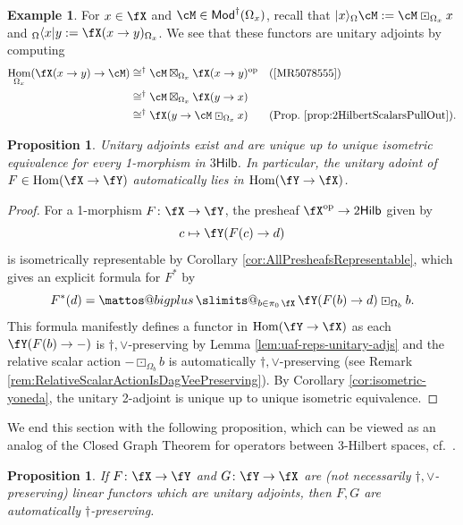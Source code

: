 \documentclass[12pt, reqno]{amsart}
\makeatletter
\DeclareMathOperator{\Hom}{Hom}
\DeclareMathOperator{\Irr}{\pi_0}
\newcommand{\op}{\mathrm{op}}
\newcommand{\Mod}{\mathsf{Mod}}
\newcommand{\Hilb}{\mathsf{Hilb}}
\theoremstyle{plain}
\newtheorem{prop}[thm]{Proposition}
\theoremstyle{definition}
\newtheorem{ex}[thm]{Example}
\newcommand{\bigboxplus}{%
  \DOTSB\mathop{\mathpalette\mattos@bigplus\relax}\slimits@
}
\newcommand\mattos@bigplus[2]{%
  \vcenter{\hbox{%
    \sbox\z@{$#1\sum$}%
    \resizebox{!}{0.9\dimexpr\ht\z@+\dp\z@}{\raisebox{\depth}{$\m@th#1\boxplus$}}%
  }}%
  \vphantom{\sum}%
}
\makeatother
\begin{document}
\begin{ex}
For $x\in\fX$ and $\cM\in \Mod^\dag(\Omega_x)$, recall that
$|x\rangle_\Omega \cM := \cM \boxdot_{\Omega_x} x$
and
${}_\Omega\langle x|y := \fX(x \to y)_{\Omega_x}$.
We see that these functors are unitary adjoints by computing
\begin{align*}    
\Hom_{\Omega_x}(\fX(x \to y) \to \cM)
&\cong^\dag 
\cM \boxtimes_{\Omega_x} \fX(x \to y)^{\op}
&&\text{(\cite[Prop.~3.14]{MR5078555})}
\\&\cong^\dag
\cM \boxtimes_{\Omega_x} \fX(y \to x) 
\\&\cong^\dag
\fX(y \to \cM \boxdot_{\Omega_x} x)
&&\text{(Prop.~\ref{prop:2HilbertScalarsPullOut}).}
\end{align*}
\end{ex}

\begin{prop}
Unitary adjoints exist 
and are unique up to unique isometric equivalence
for every 1-morphism in $3\Hilb$.
In particular, the unitary adoint of $F\in \Hom(\fX\to \fY)$ automatically lies in $\Hom(\fY\to \fX)$.
\end{prop}
\begin{proof}
For a 1-morphism $F\colon  \fX\to \fY$,
the presheaf $\fX^{\op}\to 2\Hilb$ given by
$$
c\mapsto \fY(F(c)\to d)
$$
is isometrically representable by Corollary \ref{cor:AllPresheafsRepresentable}, which gives an explicit formula for $F^*$ by 
\begin{equation}
\label{eq:Unitary2AdjointExists}    
F^*(d) = \bigboxplus_{b\in\Irr \fX}\, \fY(F(b)\to d) \boxdot_{\Omega_b} b.
\end{equation}
This formula manifestly defines a functor in $\Hom(\fY\to \fX)$ as each $\fY(F(b) \to - )$ is $\dag,\vee$-preserving by Lemma \ref{lem:uaf-reps-unitary-adjs} and the relative scalar action $- \boxdot_{\Omega_b} b$ is automatically $\dag,\vee$-preserving (see Remark \ref{rem:RelativeScalarActionIsDagVeePreserving}).
By Corollary \ref{cor:isometric-yoneda}, the unitary 2-adjoint is unique up to unique isometric equivalence.
\end{proof}

We end this section with the following proposition, which can be viewed as an analog of the Closed Graph Theorem for operators between 3-Hilbert spaces, cf.~\cite[Rem.~2.4]{MR4750417}.

\begin{prop}\label{prop:adjointableimpliesdagpreserving}
If $F\colon  \fX\to \fY$ and $G\colon  \fY\to \fX$ are (not necessarily $\dag,\vee$-preserving) linear functors which are unitary adjoints,
then $F,G$ are automatically $\dag$-preserving.
\end{prop}
\end{document}
